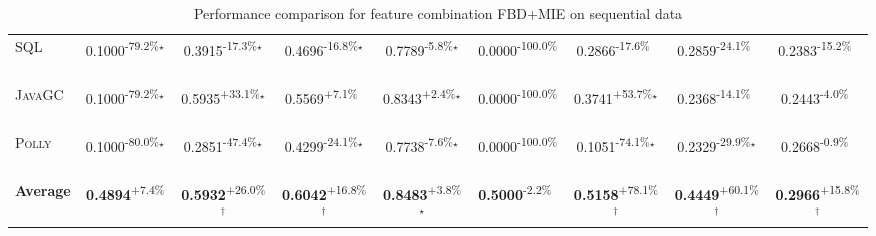 \begin{table}[htbp]
\begin{tabular}{l|cccc|cccc}
\textsc{SQL} & \cellcolor{red!30}0.1000\textsuperscript{-79.2\%}$^\star$ & \cellcolor{red!30}0.3915\textsuperscript{-17.3\%}$^\star$ & \cellcolor{red!30}0.4696\textsuperscript{-16.8\%}$^\star$ & \cellcolor{red!30}0.7789\textsuperscript{-5.8\%}$^\star$ & \cellcolor{red!30}0.0000\textsuperscript{-100.0\%}$^{\,\,\,}$ & \cellcolor{red!30}0.2866\textsuperscript{-17.6\%}$^{\,\,\,}$ & \cellcolor{red!30}0.2859\textsuperscript{-24.1\%}$^{\,\,\,}$ & \cellcolor{red!30}0.2383\textsuperscript{-15.2\%}$^{\,\,\,}$ \\
\textsc{JavaGC} & \cellcolor{red!30}0.1000\textsuperscript{-79.2\%}$^\star$ & \cellcolor{green!30}0.5935\textsuperscript{+33.1\%}$^\star$ & \cellcolor{green!30}0.5569\textsuperscript{+7.1\%}$^{\,\,\,}$ & \cellcolor{green!30}0.8343\textsuperscript{+2.4\%}$^\star$ & \cellcolor{red!30}0.0000\textsuperscript{-100.0\%}$^{\,\,\,}$ & \cellcolor{green!30}0.3741\textsuperscript{+53.7\%}$^\star$ & \cellcolor{red!30}0.2368\textsuperscript{-14.1\%}$^{\,\,\,}$ & \cellcolor{red!30}0.2443\textsuperscript{-4.0\%}$^{\,\,\,}$ \\
\textsc{Polly} & \cellcolor{red!30}0.1000\textsuperscript{-80.0\%}$^\star$ & \cellcolor{red!30}0.2851\textsuperscript{-47.4\%}$^\star$ & \cellcolor{red!30}0.4299\textsuperscript{-24.1\%}$^\star$ & \cellcolor{red!30}0.7738\textsuperscript{-7.6\%}$^\star$ & \cellcolor{red!30}0.0000\textsuperscript{-100.0\%}$^{\,\,\,}$ & \cellcolor{red!30}0.1051\textsuperscript{-74.1\%}$^\star$ & \cellcolor{red!30}0.2329\textsuperscript{-29.9\%}$^\star$ & \cellcolor{red!30}0.2668\textsuperscript{-0.9\%}$^{\,\,\,}$ \\
\hline
\textbf{Average} & \cellcolor{green!30}\textbf{0.4894}\textsuperscript{+7.4\%}$^{\,\,\,}$ & \cellcolor{green!30}\textbf{0.5932}\textsuperscript{+26.0\%}$^\dagger$ & \cellcolor{green!30}\textbf{0.6042}\textsuperscript{+16.8\%}$^\dagger$ & \cellcolor{green!30}\textbf{0.8483}\textsuperscript{+3.8\%}$^\star$ & \cellcolor{red!30}\textbf{0.5000}\textsuperscript{-2.2\%}$^{\,\,\,}$ & \cellcolor{green!30}\textbf{0.5158}\textsuperscript{+78.1\%}$^\dagger$ & \cellcolor{green!30}\textbf{0.4449}\textsuperscript{+60.1\%}$^\dagger$ & \cellcolor{green!30}\textbf{0.2966}\textsuperscript{+15.8\%}$^\dagger$ \\
\hline
\end{tabular}
\caption{Performance comparison for feature combination FBD+MIE on sequential data}
\label{tab:combo_FBD_MIE_performance_sequential}
\end{table}